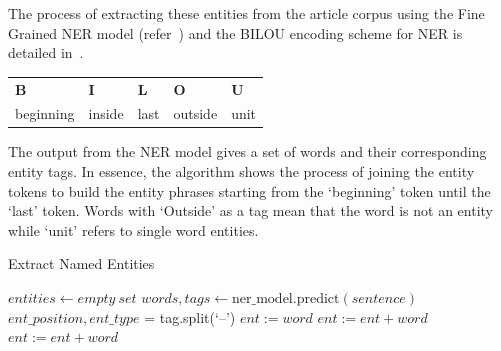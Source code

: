 The process of extracting these entities from the article corpus using the Fine Grained NER model (refer~) and the BILOU encoding scheme for NER is detailed in~.

\begin{tabularx}{\textwidth}{X X X X X} 
  \textbf{B} & \textbf{I}  & \textbf{L}  & \textbf{O}  & \textbf{U} \\
  beginning & inside & last & outside &  unit \\
  \end{tabularx}

The output from the NER model gives a set of words and their corresponding entity tags. In essence, the algorithm shows the process of joining the entity tokens to build the entity phrases starting from the `beginning' token until the `last' token. Words with `Outside' as a tag mean that the word is not an entity while `unit' refers to single word entities.  

\begin{algorithm}[H]
  \caption{Extract Named Entities}
  \label{alg:named_ents}
  \begin{algorithmic}   
  \State $entities \leftarrow empty \ set$
  \State $words, tags \leftarrow \text{ner\_model.predict}(sentence)$
        \EndIf
    \State $ ent\_position, ent\_type$ = tag.split(`--')
    \Else
      \State $ent := word$
      \State  $ent := ent + word$
      \State  $ent := ent + word$
      \EndIf
    \EndIf
  \EndFor
\end{algorithmic}
\end{algorithm}

